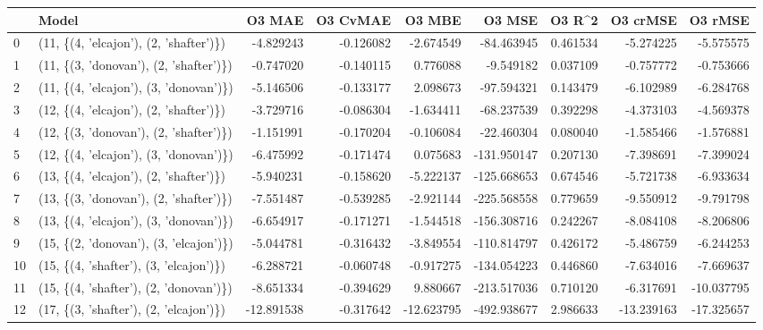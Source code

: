 \begin{tabular}{llrrrrrrr}
\toprule
{} &                                   Model &     O3 MAE &  O3 CvMAE &     O3 MBE &      O3 MSE &    O3 R\textasciicircum2 &   O3 crMSE &    O3 rMSE \\
\midrule
0  &  (11, \{(4, 'elcajon'), (2, 'shafter')\}) &  -4.829243 & -0.126082 &  -2.674549 &  -84.463945 &  0.461534 &  -5.274225 &  -5.575575 \\
1  &  (11, \{(3, 'donovan'), (2, 'shafter')\}) &  -0.747020 & -0.140115 &   0.776088 &   -9.549182 &  0.037109 &  -0.757772 &  -0.753666 \\
2  &  (11, \{(4, 'elcajon'), (3, 'donovan')\}) &  -5.146506 & -0.133177 &   2.098673 &  -97.594321 &  0.143479 &  -6.102989 &  -6.284768 \\
3  &  (12, \{(4, 'elcajon'), (2, 'shafter')\}) &  -3.729716 & -0.086304 &  -1.634411 &  -68.237539 &  0.392298 &  -4.373103 &  -4.569378 \\
4  &  (12, \{(3, 'donovan'), (2, 'shafter')\}) &  -1.151991 & -0.170204 &  -0.106084 &  -22.460304 &  0.080040 &  -1.585466 &  -1.576881 \\
5  &  (12, \{(4, 'elcajon'), (3, 'donovan')\}) &  -6.475992 & -0.171474 &   0.075683 & -131.950147 &  0.207130 &  -7.398691 &  -7.399024 \\
6  &  (13, \{(4, 'elcajon'), (2, 'shafter')\}) &  -5.940231 & -0.158620 &  -5.222137 & -125.668653 &  0.674546 &  -5.721738 &  -6.933634 \\
7  &  (13, \{(3, 'donovan'), (2, 'shafter')\}) &  -7.551487 & -0.539285 &  -2.921144 & -225.568558 &  0.779659 &  -9.550912 &  -9.791798 \\
8  &  (13, \{(4, 'elcajon'), (3, 'donovan')\}) &  -6.654917 & -0.171271 &  -1.544518 & -156.308716 &  0.242267 &  -8.084108 &  -8.206806 \\
9  &  (15, \{(2, 'donovan'), (3, 'elcajon')\}) &  -5.044781 & -0.316432 &  -3.849554 & -110.814797 &  0.426172 &  -5.486759 &  -6.244253 \\
10 &  (15, \{(4, 'shafter'), (3, 'elcajon')\}) &  -6.288721 & -0.060748 &  -0.917275 & -134.054223 &  0.446860 &  -7.634016 &  -7.669637 \\
11 &  (15, \{(4, 'shafter'), (2, 'donovan')\}) &  -8.651334 & -0.394629 &   9.880667 & -213.517036 &  0.710120 &  -6.317691 & -10.037795 \\
12 &  (17, \{(3, 'shafter'), (2, 'elcajon')\}) & -12.891538 & -0.317642 & -12.623795 & -492.938677 &  2.986633 & -13.239163 & -17.325657 \\

\end{tabular}
